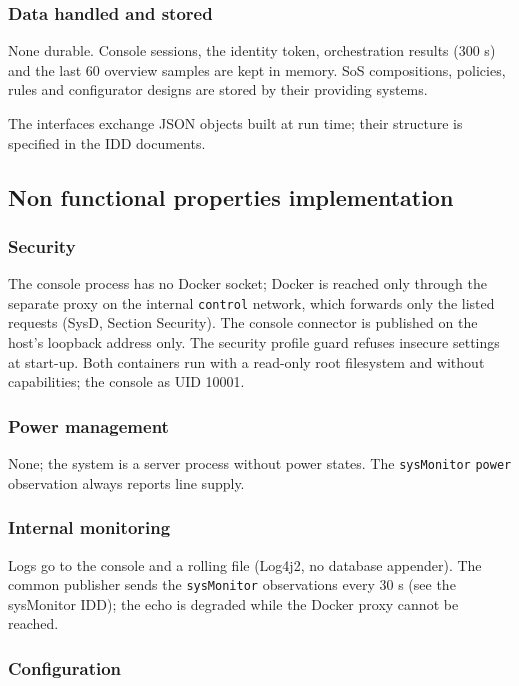 \documentclass[a4paper]{arrowhead}
\begin{document}
\subsubsection{Data handled and stored}

None durable. Console sessions, the identity token, orchestration results (300 s) and the last 60 overview samples are kept in memory. SoS compositions, policies, rules and configurator designs are stored by their providing systems.

The interfaces exchange JSON objects built at run time; their structure is specified in the IDD documents.

\subsection{Non functional properties implementation}

\subsubsection{Security}

The console process has no Docker socket; Docker is reached only through the separate proxy on the internal \texttt{control} network, which forwards only the listed requests (SysD, Section Security). The console connector is published on the host's loopback address only. The security profile guard refuses insecure settings at start-up. Both containers run with a read-only root filesystem and without capabilities; the console as UID 10001.

\subsubsection{Power management}

None; the system is a server process without power states. The \texttt{sysMonitor} \texttt{power} observation always reports line supply.

\subsubsection{Internal monitoring}

Logs go to the console and a rolling file (Log4j2, no database appender). The common publisher sends the \texttt{sysMonitor} observations every 30 s (see the sysMonitor IDD); the echo is degraded while the Docker proxy cannot be reached.

\subsubsection{Configuration}
\end{document}
